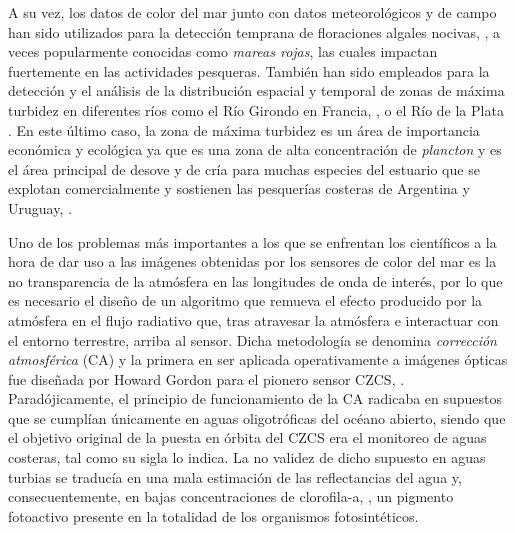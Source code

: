     A su vez, los datos de color del mar junto con datos meteorológicos y de campo han sido utilizados para la detección temprana de floraciones algales nocivas, \cite{stumpf2003b}, a veces popularmente conocidas como \textit{mareas rojas}, las cuales impactan fuertemente en las actividades pesqueras. También han sido empleados para la detección y el análisis de la distribución espacial y temporal de zonas de máxima turbidez en diferentes ríos como el Río Girondo en Francia, \cite{doxaran2006}, o el Río de la Plata \cite{framinan1996}. En este último caso, la zona de máxima turbidez es un área de importancia económica y ecológica ya que es una zona de alta concentración de \textit{plancton} \cite{acha2004} y es el área principal de desove y de cría para muchas especies del estuario que se explotan comercialmente y sostienen las pesquerías costeras de Argentina y Uruguay, \cite{macchi1996}\cite{acha1999}\cite{jaureguizar2003}.
    
 
    Uno de los problemas más importantes a los que se enfrentan los científicos a la hora de dar uso a las imágenes obtenidas por los sensores de color del mar es la no transparencia de la atmósfera en las longitudes de onda de interés, por lo que es necesario el diseño de un algoritmo que remueva el efecto producido por la atmósfera en el flujo radiativo que, tras atravesar la atmósfera e interactuar con el entorno terrestre, arriba al sensor. Dicha metodología se denomina \textit{corrección atmosférica} (CA) y la primera en ser aplicada operativamente a imágenes ópticas fue diseñada por Howard Gordon para el pionero sensor CZCS, \cite{gordon1978}\cite{gordon1980}\cite{viollier1980}\cite{gordon1981}\cite{gordon1987}\cite{gordon1988}. Paradójicamente, el principio de funcionamiento de la CA radicaba en supuestos que se cumplían únicamente en aguas oligotróficas del océano abierto, siendo que el objetivo original de la puesta en órbita del CZCS era el monitoreo de aguas costeras, tal como su sigla lo indica. La no validez de dicho supuesto en aguas turbias se traducía en una mala estimación de las reflectancias del agua y, consecuentemente, en bajas concentraciones de clorofila-a, \cite{chavez1995}, un pigmento fotoactivo presente en la totalidad de los organismos fotosintéticos.

